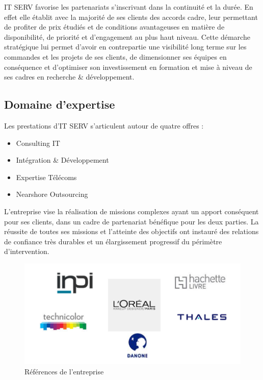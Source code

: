\begin{spacing}{1.5}
IT SERV favorise les partenariats s'inscrivant dans la continuité et la durée. En effet elle établit avec la majorité de ses clients des accords cadre, leur permettant de profiter de prix étudiés et de conditions avantageuses en matière de disponibilité, de priorité et d'engagement au plus haut niveau. Cette démarche stratégique lui permet d'avoir en contrepartie une visibilité long terme sur les commandes et les projets de ses clients, de dimensionner ses équipes en conséquence et d'optimiser son investissement en formation et mise à niveau de ses cadres en recherche \& développement.

\subsection{Domaine d'expertise}
Les prestations d'IT SERV s'articulent autour de quatre offres :
\begin{itemize}
    \item Consulting IT
    \item Intégration \& Développement
    \item Expertise Télécoms
    \item Nearshore Outsourcing
\end{itemize}
L'entreprise vise la réalisation de missions complexes ayant un apport conséquent pour ses clients, dans un cadre de partenariat bénéfique pour les deux parties. La réussite de toutes ses missions et l'atteinte des objectifs ont instauré des relations de confiance très durables et un élargissement progressif du périmètre d'intervention.

\begin{figure}[!ht]
\centering
\includegraphics[scale=0.8]{reference.png}
\caption{Références de l'entreprise}
\label{refenrences}
\end{figure}


\end{spacing}

